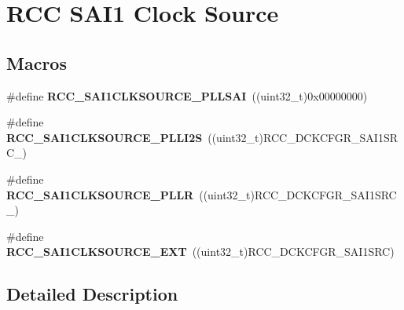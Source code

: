 \hypertarget{group___r_c_c_ex___s_a_i1___clock___source}{}\section{R\+CC S\+A\+I1 Clock Source}
\label{group___r_c_c_ex___s_a_i1___clock___source}
\subsection*{Macros}
\begin{DoxyCompactItemize}
\item 
\#define {\bfseries R\+C\+C\+\_\+\+S\+A\+I1\+C\+L\+K\+S\+O\+U\+R\+C\+E\+\_\+\+P\+L\+L\+S\+AI}~((uint32\+\_\+t)0x00000000)\hypertarget{group___r_c_c_ex___s_a_i1___clock___source_ga5dac6fab738e864e0ae930f7f853c223}{}\label{group___r_c_c_ex___s_a_i1___clock___source_ga5dac6fab738e864e0ae930f7f853c223}

\item 
\#define {\bfseries R\+C\+C\+\_\+\+S\+A\+I1\+C\+L\+K\+S\+O\+U\+R\+C\+E\+\_\+\+P\+L\+L\+I2S}~((uint32\+\_\+t)R\+C\+C\+\_\+\+D\+C\+K\+C\+F\+G\+R\+\_\+\+S\+A\+I1\+S\+R\+C\+\_)\hypertarget{group___r_c_c_ex___s_a_i1___clock___source_ga0b1b38441bc359af567e8202e1b8480d}{}\label{group___r_c_c_ex___s_a_i1___clock___source_ga0b1b38441bc359af567e8202e1b8480d}

\item 
\#define {\bfseries R\+C\+C\+\_\+\+S\+A\+I1\+C\+L\+K\+S\+O\+U\+R\+C\+E\+\_\+\+P\+L\+LR}~((uint32\+\_\+t)R\+C\+C\+\_\+\+D\+C\+K\+C\+F\+G\+R\+\_\+\+S\+A\+I1\+S\+R\+C\+\_)\hypertarget{group___r_c_c_ex___s_a_i1___clock___source_gae745172ea4ca7bd8427f0f966a2d81f7}{}\label{group___r_c_c_ex___s_a_i1___clock___source_gae745172ea4ca7bd8427f0f966a2d81f7}

\item 
\#define {\bfseries R\+C\+C\+\_\+\+S\+A\+I1\+C\+L\+K\+S\+O\+U\+R\+C\+E\+\_\+\+E\+XT}~((uint32\+\_\+t)R\+C\+C\+\_\+\+D\+C\+K\+C\+F\+G\+R\+\_\+\+S\+A\+I1\+S\+RC)\hypertarget{group___r_c_c_ex___s_a_i1___clock___source_ga3850712bf0fad312964eb2a52dda5ee1}{}\label{group___r_c_c_ex___s_a_i1___clock___source_ga3850712bf0fad312964eb2a52dda5ee1}

\end{DoxyCompactItemize}


\subsection{Detailed Description}
